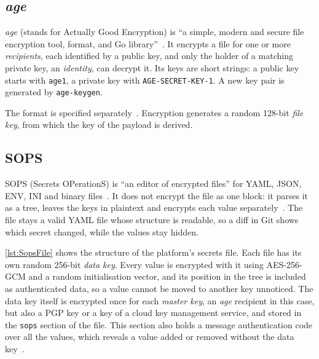 \subsection{\textit{age}}
\label{sec:BgAge}
\textit{age} (stands for Actually Good Encryption) is ``a simple, modern and secure file encryption tool, format, and Go library''~\cite{Age}. It encrypts a file for one or more \emph{recipients}, each identified by a public key, and only the holder of a matching private key, an \emph{identity}, can decrypt it. Its keys are short strings: a public key starts with \texttt{age1}, a private key with \texttt{AGE-SECRET-KEY-1}. A new key pair is generated by \texttt{age-keygen}.

The format is specified separately~\cite{AgeSpec}. Encryption generates a random 128-bit \emph{file key}, from which the key of the payload is derived.

\subsection{SOPS}
\label{sec:BgSops}
SOPS (Secrets OPerationS) is ``an editor of encrypted files'' for YAML, JSON, ENV, INI and binary files~\cite{SOPS}. It does not encrypt the file as one block: it parses it as a tree, leaves the keys in plaintext and encrypts each value separately~\cite{SOPSDocs}. The file stays a valid YAML file whose structure is readable, so a diff in Git shows which secret changed, while the values stay hidden.

\autoref{lst:SopsFile} shows the structure of the platform's secrets file. Each file has its own random 256-bit \emph{data key}. Every value is encrypted with it using AES-256-GCM and a random initialisation vector, and its position in the tree is included as authenticated data, so a value cannot be moved to another key unnoticed. The data key itself is encrypted once for each \emph{master key}, an \textit{age} recipient in this case, but also a PGP key or a key of a cloud key management service, and stored in the \texttt{sops} section of the file. This section also holds a message authentication code over all the values, which reveals a value added or removed without the data key~\cite{SOPSDocs}.

